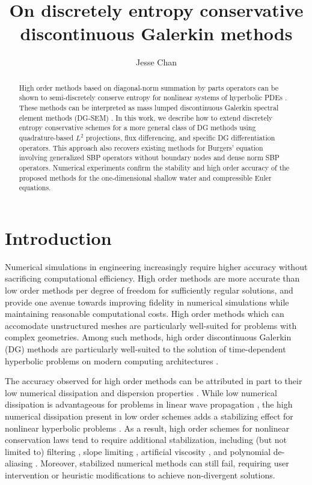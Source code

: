\documentclass[preprint,10pt]{article}
\date{}
\author{Jesse Chan}
\title{On discretely entropy conservative discontinuous Galerkin methods}
\theoremstyle{definition}
\theoremstyle{lemma}
\theoremstyle{theorem}
\theoremstyle{assumption}
\begin{document}
\maketitle

\begin{abstract}
High order methods based on diagonal-norm summation by parts operators can be shown to semi-discretely conserve entropy for nonlinear systems of hyperbolic PDEs \cite{fisher2013high,carpenter2014entropy}.  These methods can be interpreted as mass lumped discontinuous Galerkin spectral element methods (DG-SEM) \cite{gassner2016split,gassner2016well,wintermeyer2017entropy, chen2017entropy}.  In this work, we describe how to extend discretely entropy conservative schemes for a more general class of DG methods using quadrature-based $L^2$ projections, flux differencing, and specific DG differentiation operators.  This approach also recovers existing methods for Burgers' equation involving generalized SBP operators without boundary nodes and dense norm SBP operators.  Numerical experiments confirm the stability and high order accuracy of the proposed methods for the one-dimensional shallow water and compressible Euler equations.  
\end{abstract}


\section{Introduction}

Numerical simulations in engineering increasingly require higher accuracy without sacrificing computational efficiency.  High order methods are more accurate than low order methods per degree of freedom for sufficiently regular solutions, and provide one avenue towards improving fidelity in numerical simulations while maintaining reasonable computational costs.  High order methods which can accomodate unstructured meshes are particularly well-suited for problems with complex geometries.  Among such methods, high order discontinuous Galerkin (DG) methods are particularly well-suited to the solution of time-dependent hyperbolic problems on modern computing architectures \cite{hesthaven2007nodal, klockner2009nodal}.  

The accuracy observed for high order methods can be attributed in part to their low numerical dissipation and dispersion properties \cite{ainsworth2004dispersive}.  While low numerical dissipation is advantageous for problems in linear wave propagation \cite{chan2015gpu}, the high numerical dissipation present in low order schemes adds a stabilizing effect for nonlinear hyperbolic problems \cite{wang2013high}.  As a result, high order schemes for nonlinear conservation laws tend to require additional stabilization, including (but not limited to) filtering \cite{hesthaven2007nodal}, slope limiting \cite{krivodonova2007limiters}, artificial viscosity \cite{persson2006sub}, and polynomial de-aliasing \cite{ karniadakis2013spectral, kirby2003aliasing}.  Moreover, stabilized numerical methods can still fail, requiring user intervention or heuristic modifications to achieve non-divergent solutions.  
\end{document}
